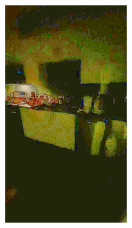 \documentclass[letterpaper,12pt]{article}
\begin{document}
\begin{figure}[htbp]
\begin{subfigure}{0.128\textwidth}
			\includegraphics[width=\linewidth]{LoLi-Phone-imgT/Retinex-Net}
			\captionsetup{font=scriptsize}
			\caption{}
			\label{fig: LoLi-Phone-imgT_d}
		\end{subfigure}
		\begin{subfigure}{0.128\textwidth}

\end{subfigure}
\end{figure}
\end{document}
